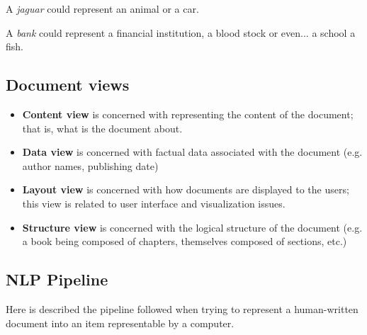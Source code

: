 A {\it jaguar} could represent an animal or a car.

A {\it bank} could represent a financial institution, a blood stock or even... a school a fish.

\subsection{Document views}

\begin{itemize}
	\item {\bf Content view} is concerned with representing the content of the document; that is, what is the document about.
	\item {\bf Data view}  is concerned with factual data associated with the document (e.g. author names, publishing date)
	\item {\bf Layout view} is concerned with how documents are displayed to the users; this view is related to user interface and visualization issues.
	\item {\bf Structure view} is concerned with the logical structure of the document (e.g. a book being composed of chapters, themselves composed of sections, etc.)
\end{itemize}


\subsection{NLP Pipeline}

Here is described the pipeline followed when trying to represent a human-written document into an item representable by a computer.

